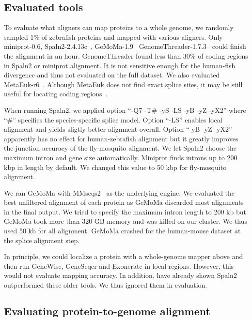 \documentclass{bioinfo}
\begin{document}
\subsection{Evaluated tools}

To evaluate what aligners can map proteins to a whole genome, we randomly
sampled 1\% of zebrafish proteins and mapped with various aligners. Only
miniprot-0.6, Spaln2-2.4.13c~\citep{Iwata:2012aa}, GeMoMa-1.9~\citep{Keilwagen:2019wz}
GenomeThreader-1.7.3~\citep{DBLP:journals/infsof/GremmeBSK05} could finish the
alignment in an hour.  GenomeThreader found less than 30\% of coding regions in
Spaln2 or miniprot alignment. It is not sensitive enough for the human-fish
divergence and thus not evaluated on the full dataset. We also evaluated
MetaEuk-r6~\citep{Levy-Karin:2020to}. Although MetaEuk does not find exact
splice sites, it may be still useful for locating coding
regions~\citep{Manni:2021ww}.

When running Spaln2, we applied option ``-Q7 -T\# -yS -LS -yB -yZ -yX2'' where
``\#'' specifies the species-specific splice model. Option ``-LS'' enables
local alignment and yields sligtly better alignment overall. Option ``-yB -yZ
-yX2'' apparently has no effect for human-zebrafish alignment but it greatly
improves the junction accuracy of the fly-mosquito alignment. We let Spaln2
choose the maximum intron and gene size automatically. Miniprot finds introns
up to 200 kbp in length by default. We changed this value to 50 kbp for
fly-mosquito alignment.

We ran GeMoMa with MMseqs2~\citep{Steinegger:2017aa} as the underlying
engine. We evaluated the best unfiltered alignment of each protein as GeMoMa
discarded most alignments in the final output. We tried to specify the maximum
intron length to 200 kb but GeMoMa took more than 320 GB memory and was killed
on our cluster. We thus used 50 kb for all alignment. GeMoMa crashed for the
human-mouse dataset at the splice alignment step.

In principle, we could localize a protein with a whole-genome mapper above and
then run GeneWise, GeneSeqer and Exonerate in local regions. However, this
would not evaluate mapping accuracy. In addition, \citet{Iwata:2012aa} have
already shown Spaln2 outperformed these older tools. We thus ignored them in
evaluation.

\subsection{Evaluating protein-to-genome alignment}
\end{document}
